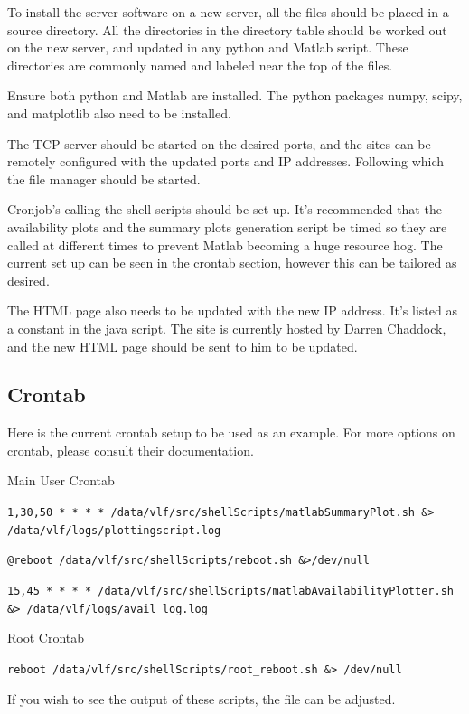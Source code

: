 \documentclass{article}
\begin{document}
To install the server software on a new server, all the files should be placed in a source directory. All the directories in the directory table should be worked out on the new server, and updated in any python and Matlab script. These directories are commonly named and labeled near the top of the files.

Ensure both python and Matlab are installed. The python packages numpy, scipy, and matplotlib also need to be installed.

The TCP server should be started on the desired ports, and the sites can be remotely configured with the updated ports and IP addresses. Following which the file manager should be started.

Cronjob's calling the shell scripts should be set up. It's recommended that the availability plots and the summary plots generation script be timed so they are called at different times to prevent Matlab becoming a huge resource hog. The current set up can be seen in the crontab section, however this can be tailored as desired.

The HTML page also needs to be updated with the new IP address. It's listed as a constant in the java script. The site is currently hosted by Darren Chaddock, and the new HTML page should be sent to him to be updated. 

\subsection{Crontab}
Here is the current crontab setup to be used as an example. For more options on crontab, please consult their documentation.

Main User Crontab

\texttt{1,30,50 * * * * /data/vlf/src/shellScripts/matlabSummaryPlot.sh \&> /data/vlf/logs/plottingscript.log}

\texttt{@reboot  /data/vlf/src/shellScripts/reboot.sh \&>/dev/null}

\texttt{15,45 * * * * /data/vlf/src/shellScripts/matlabAvailabilityPlotter.sh \&> /data/vlf/logs/avail\_log.log}

Root Crontab

\texttt{reboot /data/vlf/src/shellScripts/root\_reboot.sh \&> /dev/null}

If you wish to see the output of these scripts, the file can be adjusted.
\end{document}
